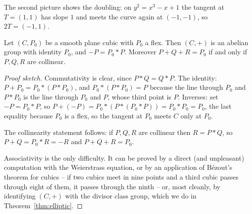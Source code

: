 \documentclass[a4paper]{scrartcl}
\begin{document}
\begin{center}
\end{center}

The second picture shows the doubling: on $y^2 = x^3-x+1$ the tangent at $T = (1,1)$ has slope $1$ and meets the curve again at $(-1,-1)$, so $2T = (-1,1)$.

\begin{theorem}\label{thm:grouplaw}
	Let $(C,P_0)$ be a smooth plane cubic with $P_0$ a flex. Then $(C,+)$ is an abelian group with identity $P_0$, and $-P = P_0 * P$. Moreover $P + Q + R = P_0$ if and only if $P, Q, R$ are collinear.
\end{theorem}

\begin{proof}[Proof sketch]
	Commutativity is clear, since $P*Q = Q*P$. The identity: $P + P_0 = P_0*(P*P_0)$, and $P_0 * (P*P_0) = P$ because the line through $P_0$ and $P*P_0$ is the line through $P_0$ and $P$, whose third point is $P$. Inverses: set $-P = P_0*P$, so $P + (-P) = P_0*(P * (P_0*P)) = P_0 * P_0 = P_0$, the last equality because $P_0$ is a flex, so the tangent at $P_0$ meets $C$ only at $P_0$.

	The collinearity statement follows: if $P,Q,R$ are collinear then $R = P*Q$, so $P+Q = P_0*R = -R$ and $P+Q+R = P_0$.

	Associativity is the only difficulty. It can be proved by a direct (and unpleasant) computation with the Weierstrass equation, or by an application of B\'ezout's theorem for cubics -- if two cubics meet in nine points and a third cubic passes through eight of them, it passes through the ninth -- or, most cleanly, by identifying $(C,+)$ with the divisor class group, which we do in Theorem~\ref{thm:elliptic}.
\end{proof}
\end{document}
